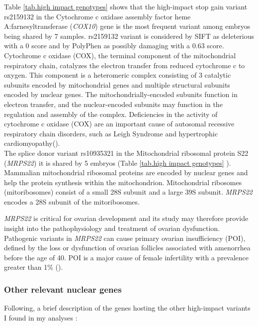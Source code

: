 Table \ref{tab.high impact genotypes} shows that the high-impact stop gain variant rs2159132 in the Cytochrome c oxidase assembly factor heme A:farnesyltransferase (\textit{COX10}) gene is the most frequent variant among embryos being shared by 7 samples. rs2159132 variant is considered by SIFT as deleterious with a 0 score and by PolyPhen as possibly damaging with a 0.63 score. Cytochrome c oxidase (COX), the terminal component of the mitochondrial respiratory chain, catalyzes the electron transfer from reduced cytochrome c to oxygen. This component is a heteromeric complex consisting of 3 catalytic subunits encoded by mitochondrial genes and multiple structural subunits encoded by nuclear genes. The mitochondrially-encoded subunits function in electron transfer, and the nuclear-encoded subunits may function in the regulation and assembly of the complex.
Deficiencies in the activity of cytochrome c oxidase (COX) are an important cause of autosomal recessive respiratory chain disorders, such as Leigh Syndrome and hypertrophic cardiomyopathy(\cite{antonicka2003mutations}).\\ 


The splice donor variant rs10935321 in the Mitochondrial ribosomal
protein S22 (\textit{MRPS22}) it is shared by 5 embryos (Table
\ref{tab.high impact genotypes} ).
Mammalian mitochondrial ribosomal proteins are encoded by nuclear
genes and help the protein synthesis within the mitochondrion.
Mitochondrial ribosomes (mitoribosomes) consist of a small 28S
subunit and a large 39S subunit. \textit{MRPS22} encodes a 28S
subunit of the mitoribosomes.

\textit{MRPS22} is critical for ovarian development and its study
may therefore provide insight into the pathophysiology and
treatment of ovarian dysfunction. Pathogenic variants in
\textit{MRPS22} can cause primary ovarian insufficiency (POI),
defined by the loss or dysfunction of ovarian follicles associated
with amenorrhea before the age of 40. POI is a major cause of
female infertility with a prevalence greater than 1\%
(\cite{chen2018mutations}).\\ 

\subsubsection{Other relevant nuclear genes}
Following, a brief description of the genes hosting the other high-impact variants I found in my analyses : \\


